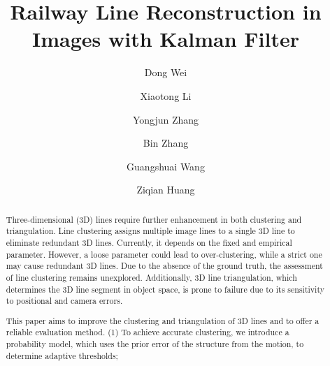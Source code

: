 \documentclass[a4paper]{cas-sc}
\begin{document}
\linenumbers
\let\WriteBookmarks\relax
\def\floatpagepagefraction{1}

\shorttitle{}

\title [mode = title]{Railway Line Reconstruction in Images with Kalman Filter }                      


%
\author[1]{Dong Wei}
\fnmark[1]
\author[1]{Xiaotong Li}
\fnmark[1]
\author[1]{Yongjun Zhang}
\cormark[1]
\author[1]{Bin Zhang}
\fnmark[1]
\author[1]{Guangshuai Wang}
\fnmark[1]
\author[1]{Ziqian Huang}
\fnmark[1]







\begin{abstract}
Three-dimensional (3D) lines require further enhancement in both clustering and triangulation. 
Line clustering assigns multiple image lines to a single 3D line to eliminate redundant 3D lines.
Currently, it depends on the fixed and empirical parameter.
However,
a loose parameter could lead to over-clustering, 
while a strict one may cause redundant 3D lines. 
Due to the absence of the ground truth, 
the assessment of line clustering remains unexplored.
Additionally, 
3D line triangulation, 
which determines the 3D line segment in object space, 
is prone to failure due to its sensitivity to positional and camera errors.

\noindent This paper aims to improve the clustering and triangulation of 3D lines and to offer a reliable evaluation method. 
(1) To achieve accurate clustering, 
we introduce a probability model,
which uses the prior error of the structure from the motion,
to determine adaptive thresholds;
\end{abstract}
\end{document}
